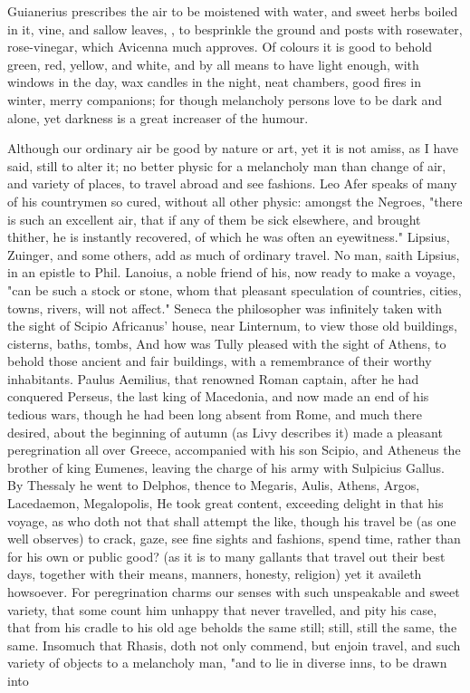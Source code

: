 {Guianerius prescribes the air to be moistened with water, and sweet herbs boiled in it, vine, and sallow leaves, \etc{}, to besprinkle the ground and posts with rosewater, rose-vinegar, which Avicenna much approves. Of colours it is good to behold green, red, yellow, and white, and by all means to have light enough, with windows in the day, wax candles in the night, neat chambers, good fires in winter, merry companions; for though melancholy persons love to be dark and alone, yet darkness is a great increaser of the humour.

Although our ordinary air be good by nature or art, yet it is not amiss, as I have said, still to alter it; no better physic for a melancholy man than change of air, and variety of places, to travel abroad and see fashions. Leo Afer speaks of many of his countrymen so cured, without all other physic: amongst the Negroes, "there is such an excellent air, that if any of them be sick elsewhere, and brought thither, he is instantly recovered, of which he was often an eyewitness." Lipsius, Zuinger, and some others, add as much of ordinary travel. No man, saith Lipsius, in an epistle to Phil. Lanoius, a noble friend of his, now ready to make a voyage, "can be such a stock or stone, whom that pleasant speculation of countries, cities, towns, rivers, will not affect." Seneca the philosopher was infinitely taken with the sight of Scipio Africanus' house, near Linternum, to view those old buildings, cisterns, baths, tombs, \etc{} And how was Tully pleased with the sight of Athens, to behold those ancient and fair buildings, with a remembrance of their worthy inhabitants. Paulus Aemilius, that renowned Roman captain, after he had conquered Perseus, the last king of Macedonia, and now made an end of his tedious wars, though he had been long absent from Rome, and much there desired, about the beginning of autumn (as Livy describes it) made a pleasant peregrination all over Greece, accompanied with his son Scipio, and Atheneus the brother of king Eumenes, leaving the charge of his army with Sulpicius Gallus. By Thessaly he went to Delphos, thence to Megaris, Aulis, Athens, Argos, Lacedaemon, Megalopolis, \etc{} He took great content, exceeding delight in that his voyage, as who doth not that shall attempt the like, though his travel be  (as one well observes) to crack, gaze, see fine sights and fashions, spend time, rather than for his own or public good? (as it is to many gallants that travel out their best days, together with their means, manners, honesty, religion) yet it availeth howsoever. For peregrination charms our senses with such unspeakable and sweet variety, that some count him unhappy that never travelled, and pity his case, that from his cradle to his old age beholds the same still; still, still the same, the same. Insomuch that Rhasis,  doth not only commend, but enjoin travel, and such variety of objects to a melancholy man, "and to lie in diverse inns, to be drawn into }
